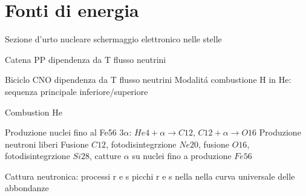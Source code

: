 \section{Fonti di energia}

\begin{frame}{Sezione d'urto nucleare}
schermaggio elettronico nelle stelle
\end{frame}

\begin{frame}{Catena PP}
dipendenza da T
flusso neutrini
\end{frame}

\begin{frame}{Biciclo CNO}
dipendenza da T
flusso neutrini
Modalit\'a combustione H in He: sequenza principale inferiore/superiore
\end{frame}

\begin{frame}{Combustion He}

\end{frame}

\begin{frame}{Produzione nuclei fino al Fe56}
3$\alpha$: $He4+\alpha\to C12$, $C12+\alpha\to O16$
Produzione neutroni liberi
Fusione $C12$, fotodisintegrzione $Ne20$, fusione $O16$, fotodisintegrzione $Si28$, catture $\alpha$ su nuclei fino a produzione $Fe56$
\end{frame}

\begin{frame}{Cattura neutronica: processi r e s}
picchi r e s nella nella curva universale delle abbondanze
\end{frame}
